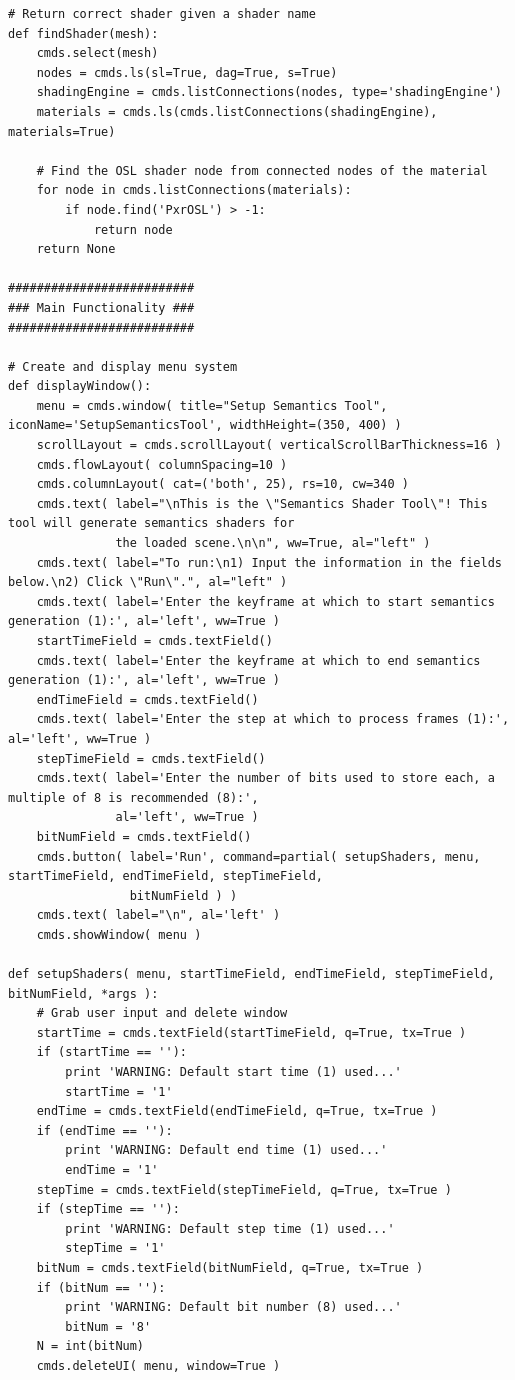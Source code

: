 \documentclass[conference]{IEEEtran}
\begin{document}
{\begin{verbatim}
# Return correct shader given a shader name
def findShader(mesh):
    cmds.select(mesh)
    nodes = cmds.ls(sl=True, dag=True, s=True)
    shadingEngine = cmds.listConnections(nodes, type='shadingEngine')
    materials = cmds.ls(cmds.listConnections(shadingEngine), materials=True)
    
    # Find the OSL shader node from connected nodes of the material
    for node in cmds.listConnections(materials):
        if node.find('PxrOSL') > -1:
            return node
    return None

##########################
### Main Functionality ###
##########################

# Create and display menu system
def displayWindow():
    menu = cmds.window( title="Setup Semantics Tool", iconName='SetupSemanticsTool', widthHeight=(350, 400) )
    scrollLayout = cmds.scrollLayout( verticalScrollBarThickness=16 )
    cmds.flowLayout( columnSpacing=10 )
    cmds.columnLayout( cat=('both', 25), rs=10, cw=340 )
    cmds.text( label="\nThis is the \"Semantics Shader Tool\"! This tool will generate semantics shaders for
               the loaded scene.\n\n", ww=True, al="left" )
    cmds.text( label="To run:\n1) Input the information in the fields below.\n2) Click \"Run\".", al="left" )
    cmds.text( label='Enter the keyframe at which to start semantics generation (1):', al='left', ww=True )
    startTimeField = cmds.textField()
    cmds.text( label='Enter the keyframe at which to end semantics generation (1):', al='left', ww=True )
    endTimeField = cmds.textField()
    cmds.text( label='Enter the step at which to process frames (1):', al='left', ww=True )
    stepTimeField = cmds.textField()
    cmds.text( label='Enter the number of bits used to store each, a multiple of 8 is recommended (8):',
               al='left', ww=True )
    bitNumField = cmds.textField()
    cmds.button( label='Run', command=partial( setupShaders, menu, startTimeField, endTimeField, stepTimeField,
                 bitNumField ) )
    cmds.text( label="\n", al='left' )
    cmds.showWindow( menu )

def setupShaders( menu, startTimeField, endTimeField, stepTimeField, bitNumField, *args ):
    # Grab user input and delete window
    startTime = cmds.textField(startTimeField, q=True, tx=True )
    if (startTime == ''):
        print 'WARNING: Default start time (1) used...'
        startTime = '1'
    endTime = cmds.textField(endTimeField, q=True, tx=True )
    if (endTime == ''):
        print 'WARNING: Default end time (1) used...'
        endTime = '1'
    stepTime = cmds.textField(stepTimeField, q=True, tx=True )
    if (stepTime == ''):
        print 'WARNING: Default step time (1) used...'
        stepTime = '1'
    bitNum = cmds.textField(bitNumField, q=True, tx=True )
    if (bitNum == ''):
        print 'WARNING: Default bit number (8) used...'
        bitNum = '8'
    N = int(bitNum)
    cmds.deleteUI( menu, window=True )
    

\end{verbatim}}
\end{document}
